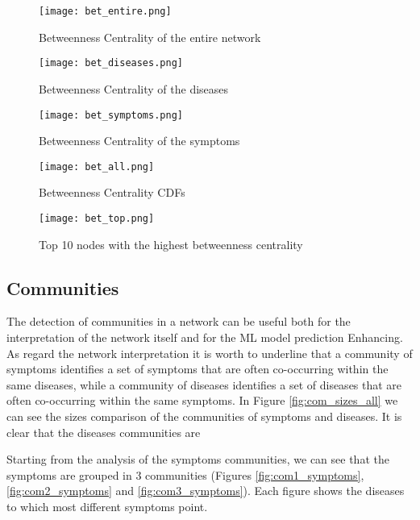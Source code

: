 \begin{figure}[H]
    \centering
    \texttt{[image: bet\_entire.png]}
    \caption{Betweenness Centrality of the entire network}
    \label{fig:bet_entire}
\end{figure}

\begin{figure}[H]
    \centering
    \texttt{[image: bet\_diseases.png]}
    \caption{Betweenness Centrality of the diseases}
    \label{fig:bet_diseases}
\end{figure}

\begin{figure}[H]
    \centering
    \texttt{[image: bet\_symptoms.png]}
    \caption{Betweenness Centrality of the symptoms}
    \label{fig:bet_symptoms}
\end{figure}

\begin{figure}[H]
   \centering
   \texttt{[image: bet\_all.png]}
   \caption{Betweenness Centrality CDFs}
   \label{fig:bet_all}
\end{figure}

\begin{figure}[H]
    \centering
    \texttt{[image: bet\_top.png]}
    \caption{Top 10 nodes with the highest betweenness centrality}
    \label{fig:bet_top}
\end{figure}


\subsection{Communities}
The detection of communities in a network can be useful both for the interpretation of the network itself and for the ML model prediction Enhancing.
As regard the network interpretation it is worth to underline that a community of symptoms identifies a set of symptoms that are 
often co-occurring within the same diseases, while a community of diseases identifies a set of diseases that are often co-occurring within the same symptoms.
In Figure \ref{fig:com_sizes_all} we can see the sizes comparison of the communities of symptoms and diseases. It is clear that the diseases communities are


Starting from the analysis of the symptoms communities, we can see that the symptoms are grouped in 3 communities (Figures \ref{fig:com1_symptoms}, 
\ref{fig:com2_symptoms} and \ref{fig:com3_symptoms}). Each figure shows the diseases to which most different symptoms point.


